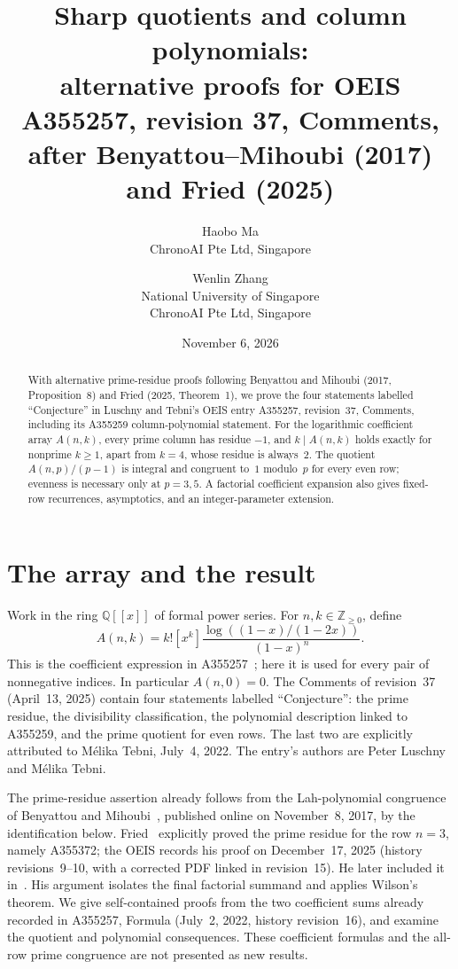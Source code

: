 \documentclass[11pt]{article}
\title{Sharp quotients and column polynomials:\\
alternative proofs for OEIS A355257, revision 37, Comments,\\
after Benyattou--Mihoubi (2017) and Fried (2025)}
\author{Haobo Ma\\\small ChronoAI Pte Ltd, Singapore
\and Wenlin Zhang\\\small National University of Singapore\\
\small ChronoAI Pte Ltd, Singapore}
\date{November 6, 2026}
\newcommand{\Nzero}{\mathbb{Z}_{\geq0}}
\begin{document}
\maketitle
\begin{abstract}
With alternative prime-residue proofs following Benyattou and
Mihoubi (2017, Proposition~8) and Fried (2025, Theorem~1), we prove
the four statements labelled ``Conjecture'' in
Luschny and Tebni's OEIS entry A355257, revision~37, Comments,
including its A355259 column-polynomial statement.
For the logarithmic coefficient array $A(n,k)$, every prime column
has residue $-1$, and $k\mid A(n,k)$ holds exactly for nonprime
$k\geq1$, apart from $k=4$, whose residue is always~$2$.
The quotient $A(n,p)/(p-1)$ is integral and congruent to~$1$ modulo~$p$
for every even row; evenness is necessary only at $p=3,5$.
A factorial coefficient expansion also gives fixed-row recurrences,
asymptotics, and an integer-parameter extension.
\end{abstract}

\section{The array and the result}
Work in the ring $\mathbb{Q}[[x]]$ of formal power series. For
$n,k\in\Nzero$, define
\begin{equation}\label{eq:def}
 A(n,k)=k![x^k]\frac{\log((1-x)/(1-2x))}{(1-x)^n}.
\end{equation}
This is the coefficient expression in A355257~\cite{oeis}; here it is
used for every pair of nonnegative indices. In particular $A(n,0)=0$.
The Comments of revision~37 (April~13, 2025) contain four statements labelled
``Conjecture'': the prime residue, the divisibility classification,
the polynomial description linked to A355259, and the prime quotient
for even rows. The last two are explicitly attributed to M\'elika
Tebni, July~4, 2022. The entry's authors are Peter Luschny and
M\'elika Tebni.

The prime-residue assertion already follows from the Lah-polynomial
congruence of Benyattou and Mihoubi~\cite[Proposition~8]{bm2017},
published online on November~8, 2017, by the identification below.
Fried~\cite[Lemma~1 and Theorem~1]{friedfirst} explicitly proved the prime
residue for the row $n=3$, namely A355372; the OEIS records his
proof on December~17, 2025 (history revisions~9--10, with a corrected
PDF linked in revision~15). He later included it
in~\cite[Section~3.9, Lemma~51 and Theorem~52, pp.~52--53]{fried}.
His argument isolates the final factorial summand and applies
Wilson's theorem. We give self-contained proofs from the two coefficient
sums already recorded in A355257, Formula (July~2, 2022, history revision~16),
and examine the quotient and polynomial consequences. These coefficient
formulas and the all-row prime congruence are not presented as new results.
\end{document}
